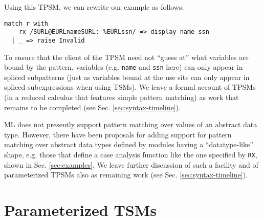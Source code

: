 Using this TPSM, we can rewrite our example as follows:
\begin{lstlisting}[numbers=none]
match r with 
    rx /SURL@EURLnameSURL: %EURLssn/ => display name ssn
  | _ => raise Invalid
\end{lstlisting}
To ensure that the client of the TPSM need not ``guess at'' what variables are bound by the pattern, variables (e.g. \lstinline{name} and \lstinline{ssn} here) can only appear in spliced subpatterns (just as variables bound at the use site can only appear in spliced subexpressions when using TSMs). We leave a formal account of TPSMs (in a reduced calculus that features simple pattern matching) as work that remains to be completed (see Sec. \ref{sec:syntax-timeline}).

ML does not presently support pattern matching over values of an abstract data type. However, there have been proposals for adding support for pattern matching over abstract data types defined by modules having a ``datatype-like'' shape, e.g. those that define a case analysis function like the one specified by \lstinline{RX}, shown in Sec. \ref{sec:examples}. We leave further discussion of such a facility and of parameterized TPSMs also as remaining work (see Sec. \ref{sec:syntax-timeline}). 

\section{Parameterized TSMs}\label{sec:tsms-parameterized}

